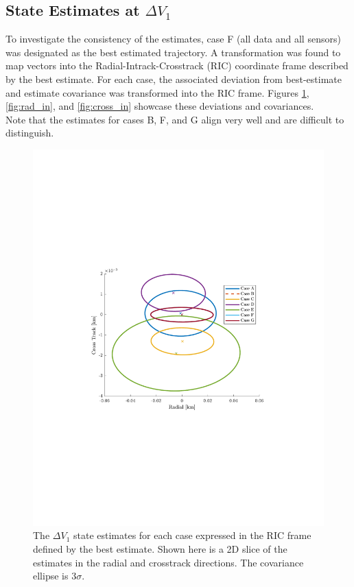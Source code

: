 \documentclass[11pt]{article}
\begin{document}
\subsection{State Estimates at $\Delta V_1$}

To investigate the consistency of the estimates, case F (all data and all sensors) was designated as the best estimated trajectory. A transformation was found to map vectors into the Radial-Intrack-Crosstrack (RIC) coordinate frame described by the best estimate. For each case, the associated deviation from best-estimate and estimate covariance was transformed into the RIC frame. Figures \ref{fig:rad_cross}, \ref{fig:rad_in}, and \ref{fig:cross_in} showcase these deviations and covariances. \\

Note that the estimates for cases B, F, and G align very well and are difficult to distinguish.

\begin{figure}[!htb]
	\centering
	\includegraphics[clip,trim=4cm 8.5cm 4cm 8.5cm, width=.5\textwidth]{figs/RC_final.pdf}
	\caption{The $\Delta V_1$ state estimates for each case expressed in the RIC frame defined by the best estimate. Shown here is a 2D slice of the estimates in the radial and crosstrack directions. The covariance ellipse is $3\sigma$.}
	\label{fig:rad_cross}
\end{figure}
\end{document}
